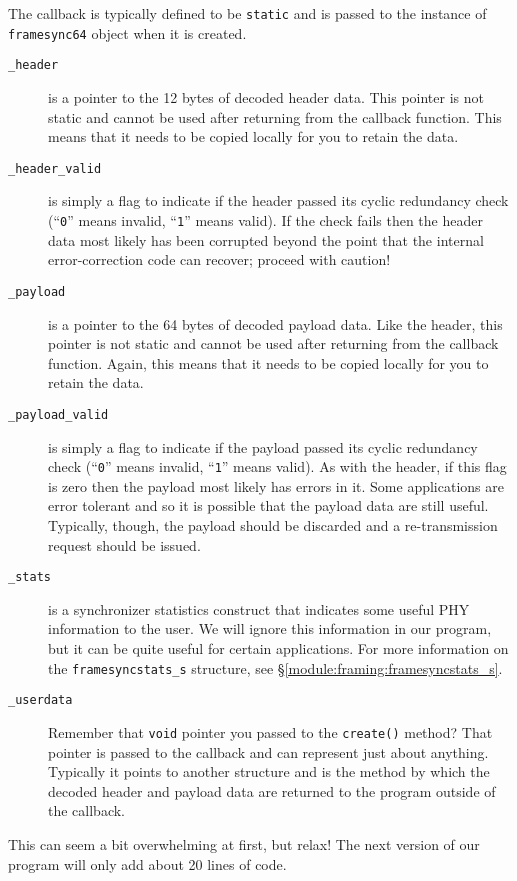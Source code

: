 %
The callback is typically defined to be {\tt static} and is passed to
the instance of {\tt framesync64} object when it is created.
%
\begin{description}
\item[{\tt \_header}]
    is a pointer to the 12 bytes of decoded header data.
    This pointer is not static and cannot be used after returning from
    the callback function.
    This means that it needs to be copied locally for you to retain the
    data.
\item[{\tt \_header\_valid}]
    is simply a flag to indicate if the header passed its cyclic
    redundancy check
    (``{\tt 0}'' means invalid, ``{\tt 1}'' means valid).
    If the check fails then the header data most likely has been
    corrupted beyond the point that the internal error-correction code
    can recover; proceed with caution!
\item[{\tt \_payload}]
    is a pointer to the 64 bytes of decoded payload data.
    Like the header,
    this pointer is not static and cannot be used after returning from
    the callback function.
    Again, this means that it needs to be copied locally for you to retain the
    data.
\item[{\tt \_payload\_valid}]
    is simply a flag to indicate if the payload passed its cyclic
    redundancy check
    (``{\tt 0}'' means invalid, ``{\tt 1}'' means valid).
    As with the header,
    if this flag is zero then the payload most likely has errors in it.
    Some applications are error tolerant and so it is possible that the
    payload data are still useful.
    Typically, though, the payload should be discarded and a
    re-transmission request should be issued.
\item[{\tt \_stats}]
    is a synchronizer statistics construct that indicates some useful
    PHY information to the user.
    We will ignore this information in our program, but it can be quite
    useful for certain applications.
    For more information on the {\tt framesyncstats\_s} structure, see
    \S\ref{module:framing:framesyncstats_s}.
\item[{\tt \_userdata}]
    Remember that {\tt void} pointer you passed to the {\tt create()}
    method?
    That pointer is passed to the callback and can represent just about
    anything.
    Typically it points to another structure and is the method
    by which the decoded header and payload data are returned to the
    program outside of the callback.
\end{description}
%
This can seem a bit overwhelming at first, but relax!
The next version of our program will only add about 20 lines of code.


